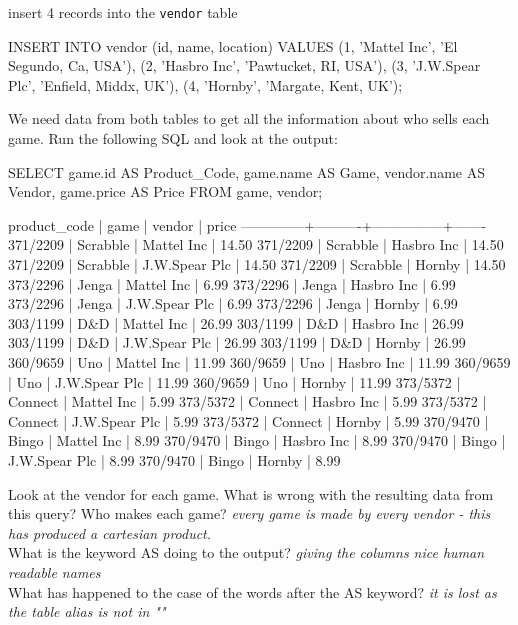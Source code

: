 insert 4 records into the \verb|vendor| table
\begin{sql}
INSERT INTO vendor (id, name, location)
   VALUES (1, 'Mattel Inc', 'El Segundo, Ca, USA'),
	(2, 'Hasbro Inc', 'Pawtucket, RI, USA'),
	(3, 'J.W.Spear Plc', 'Enfield, Middx, UK'),
	(4, 'Hornby', 'Margate, Kent, UK');
\end{sql}
We need data from both tables to get all the information about who sells each game.
Run the following SQL and look at the output:
\begin{sql}
SELECT game.id     AS Product_Code,
       game.name   AS Game,
       vendor.name AS Vendor,
       game.price  AS Price 
FROM game, vendor;
\end{sql}
\begin{pseudo}
 product_code |   game   |    vendor     | price
--------------+----------+---------------+-------
 371/2209     | Scrabble | Mattel Inc    | 14.50
 371/2209     | Scrabble | Hasbro Inc    | 14.50
 371/2209     | Scrabble | J.W.Spear Plc | 14.50
 371/2209     | Scrabble | Hornby        | 14.50
 373/2296     | Jenga    | Mattel Inc    |  6.99
 373/2296     | Jenga    | Hasbro Inc    |  6.99
 373/2296     | Jenga    | J.W.Spear Plc |  6.99
 373/2296     | Jenga    | Hornby        |  6.99
 303/1199     | D&D      | Mattel Inc    | 26.99
 303/1199     | D&D      | Hasbro Inc    | 26.99
 303/1199     | D&D      | J.W.Spear Plc | 26.99
 303/1199     | D&D      | Hornby        | 26.99
 360/9659     | Uno      | Mattel Inc    | 11.99
 360/9659     | Uno      | Hasbro Inc    | 11.99
 360/9659     | Uno      | J.W.Spear Plc | 11.99
 360/9659     | Uno      | Hornby        | 11.99
 373/5372     | Connect  | Mattel Inc    |  5.99
 373/5372     | Connect  | Hasbro Inc    |  5.99
 373/5372     | Connect  | J.W.Spear Plc |  5.99
 373/5372     | Connect  | Hornby        |  5.99
 370/9470     | Bingo    | Mattel Inc    |  8.99
 370/9470     | Bingo    | Hasbro Inc    |  8.99
 370/9470     | Bingo    | J.W.Spear Plc |  8.99
 370/9470     | Bingo    | Hornby        |  8.99
\end{pseudo}

Look at the vendor for each game. What is wrong with the resulting data from this query? Who makes each game?
\textit{every game is made by every vendor - this has produced a cartesian product.}\\


What is the keyword AS doing to the output? \textit{giving the columns nice human readable names}\\
What has happened to the case of the words after the AS keyword? \textit{it is lost as the table alias is not in ""}\\

